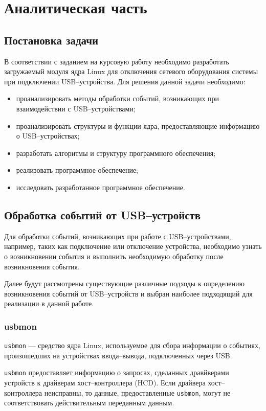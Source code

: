 \chapter{Аналитическая часть}

\section{Постановка задачи}

В соответствии с заданием на курсовую работу необходимо разработать загружаемый модуля ядра Linux для отключения сетевого оборудования системы при подключении USB--устройства. Для решения данной задачи необходимо:
\begin{itemize}
	\item проанализировать методы обработки событий, возникающих при взаимодействии с USB--устройствами;
	\item проанализировать структуры и функции ядра, предоставляющие информацию о USB--устройствах;
	\item разработать алгоритмы и структуру программного обеспечения;
	\item реализовать программное обеспечение;
	\item исследовать разработанное программное обеспечение.
\end{itemize}

\section{Обработка событий от USB--устройств}

Для обработки событий, возникающих при работе с USB--устройствами, например, таких как подключение или отключение устройства, необходимо узнать о возникновении события и выполнить необходимую обработку после возникновения события.

Далее будут рассмотрены существующие различные подходы к определению возникновения событий от USB--устройств и выбран наиболее подходящий для реализации в данной работе.

\subsection{usbmon}

\texttt{usbmon} \cite{usbmon} --- средство ядра Linux, используемое для сбора информации о событиях, произошедших на устройствах ввода--вывода, подключенных через USB.

\texttt{usbmon} предоставляет информацию о запросах, сделанных дравйверами устройств к драйверам хост--контроллера (HCD). Если драйвера хост--контроллера неисправны, то данные, предоставленные \texttt{usbmon}, могут не соответствовать действительным переданным данным.

